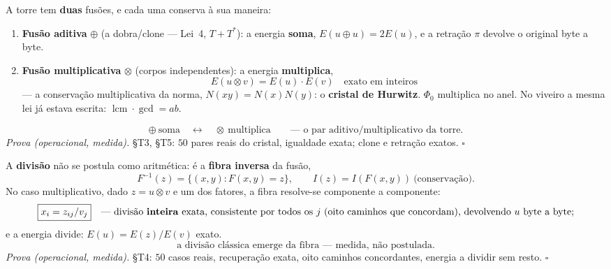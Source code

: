 \documentclass[livro.tex]{subfiles}
\begin{document}
\begin{teorema}\label{thm:fusao-mult}
A torre tem \textbf{duas} fusões, e cada uma conserva à sua maneira:
\begin{enumerate}
\item \textbf{Fusão aditiva} $\oplus$ (a dobra/clone --- Lei~4,
$T+T^{*}$): a energia \textbf{soma}, $E(u\oplus u)=2E(u)$, e a
retração $\pi$ devolve o original byte a byte.
\item \textbf{Fusão multiplicativa} $\otimes$ (corpos independentes):
a energia \textbf{multiplica},
\[
\boxed{E(u\otimes v)=E(u)\cdot E(v)}
\quad\text{exato em inteiros}
\]
--- a conservação multiplicativa da norma, $N(xy)=N(x)N(y)$: o
\textbf{cristal de Hurwitz}. $\Phi_0$ multiplica no anel. No viveiro a
mesma lei já estava escrita:
$\operatorname{lcm}\cdot\operatorname{gcd}=ab$.
\end{enumerate}
\[
\boxed{
\oplus\ \text{soma}\quad\longleftrightarrow\quad\otimes\ \text{multiplica}
\qquad\text{--- o par aditivo/multiplicativo da torre.}
}
\]
\emph{Prova (operacional, medida).} 
\S T3, \S T5: $50$ pares reais do cristal, igualdade exata; clone e
retração exatos. $\square$
\end{teorema}

\begin{teorema}[divisão $=$ fibra --- e a clássica emerge]\label{thm:divisao-fibra}
A \textbf{divisão} não se postula como aritmética: é a \textbf{fibra
inversa} da fusão,
\[
\boxed{
F^{-1}(z)=\{(x,y):F(x,y)=z\},
\qquad
I(z)=I(F(x,y))\ \text{(conservação)}.
}
\]
No caso multiplicativo, dado $z=u\otimes v$ e um dos fatores, a fibra
resolve-se componente a componente:
\[
\boxed{x_i=z_{ij}/v_j}
\quad\text{--- divisão \textbf{inteira} exata, consistente por todos os
$j$ (oito caminhos que concordam), devolvendo $u$ byte a byte;}
\]
e a energia divide: $E(u)=E(z)/E(v)$ exato.
\[
\boxed{\text{a divisão clássica emerge da fibra --- medida, não postulada.}}
\]
\emph{Prova (operacional, medida).} 
\S T4: $50$ casos reais, recuperação exata, oito caminhos concordantes,
energia a dividir sem resto. $\square$
\end{teorema}
\end{document}
